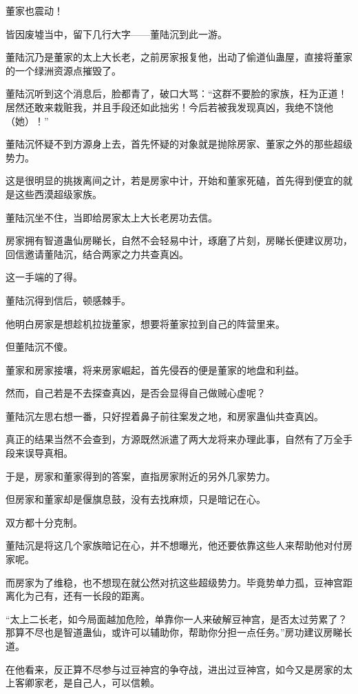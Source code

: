\begin{this_body}
董家也震动！

皆因废墟当中，留下几行大字——董陆沉到此一游。

董陆沉乃是董家的太上大长老，之前房家报复他，出动了偷道仙蛊屋，直接将董家的一个绿洲资源点摧毁了。

董陆沉听到这个消息后，脸都青了，破口大骂：“这群不要脸的家族，枉为正道！居然还敢来栽赃我，并且手段还如此拙劣！今后若被我发现真凶，我绝不饶他（她）！”

董陆沉怀疑不到方源身上去，首先怀疑的对象就是抛除房家、董家之外的那些超级势力。

这是很明显的挑拨离间之计，若是房家中计，开始和董家死磕，首先得到便宜的就是这些西漠超级家族。

董陆沉坐不住，当即给房家太上大长老房功去信。

房家拥有智道蛊仙房睇长，自然不会轻易中计，琢磨了片刻，房睇长便建议房功，回信邀请董陆沉，结合两家之力共查真凶。

这一手端的了得。

董陆沉得到信后，顿感棘手。

他明白房家是想趁机拉拢董家，想要将董家拉到自己的阵营里来。

但董陆沉不傻。

董家和房家接壤，将来房家崛起，首先侵吞的便是董家的地盘和利益。

然而，自己若是不去探查真凶，是否会显得自己做贼心虚呢？

董陆沉左思右想一番，只好捏着鼻子前往案发之地，和房家蛊仙共查真凶。

真正的结果当然不会查到，方源既然派遣了两大龙将来办理此事，自然有了万全手段来误导真相。

于是，房家和董家得到的答案，直指房家附近的另外几家势力。

但房家和董家却是偃旗息鼓，没有去找麻烦，只是暗记在心。

双方都十分克制。

董陆沉是将这几个家族暗记在心，并不想曝光，他还要依靠这些人来帮助他对付房家呢。

而房家为了维稳，也不想现在就公然对抗这些超级势力。毕竟势单力孤，豆神宫距离化为己有，还有一长段的距离。

“太上二长老，如今局面越加危险，单靠你一人来破解豆神宫，是否太过劳累了？那算不尽也是智道蛊仙，或许可以辅助你，帮助你分担一点任务。”房功建议房睇长道。

在他看来，反正算不尽参与过豆神宫的争夺战，进出过豆神宫，如今又是房家的太上客卿家老，是自己人，可以信赖。


\end{this_body}
